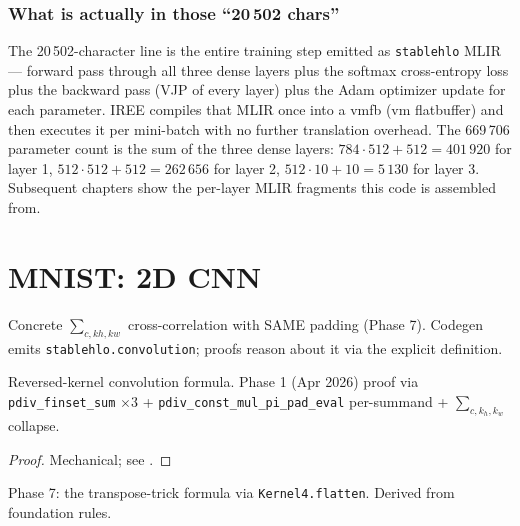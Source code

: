 \subsection*{What is actually in those ``20\,502 chars''}

The 20\,502-character line is the entire training step emitted as
\texttt{stablehlo} MLIR --- forward pass through all three dense
layers plus the softmax cross-entropy loss plus the backward pass
(VJP of every layer) plus the Adam optimizer update for each
parameter. IREE compiles that MLIR once into a vmfb (vm flatbuffer)
and then executes it per mini-batch with no further translation
overhead. The 669\,706 parameter count is the sum of the three
dense layers: $784 \cdot 512 + 512 = 401\,920$ for layer 1,
$512 \cdot 512 + 512 = 262\,656$ for layer 2, $512 \cdot 10 + 10 =
5\,130$ for layer 3. Subsequent chapters show the per-layer MLIR
fragments this code is assembled from.

\chapter{MNIST: 2D CNN}
\label{chap:cnn}

\begin{definition}
  \label{ax:conv2d}
  \leanok
  Concrete \(\sum_{c,kh,kw}\) cross-correlation with SAME padding (Phase 7).
  Codegen emits \texttt{stablehlo.convolution}; proofs reason about it
  via the explicit definition.
\end{definition}

\begin{theorem}
  \label{ax:conv2d_has_vjp3}
  \leanok
  Reversed-kernel convolution formula. Phase 1 (Apr 2026) proof
  via \texttt{pdiv\_finset\_sum} \(\times 3\) +
  \texttt{pdiv\_const\_mul\_pi\_pad\_eval} per-summand +
  \(\sum_{c,k_h,k_w}\) collapse.
\end{theorem}

\begin{proof}
\leanok
Mechanical; see .
\end{proof}

\begin{theorem}
  \label{ax:conv2d_weight_grad_has_vjp}
  \leanok
  Phase 7: the transpose-trick formula via \texttt{Kernel4.flatten}.
  Derived from foundation rules.
\end{theorem}

